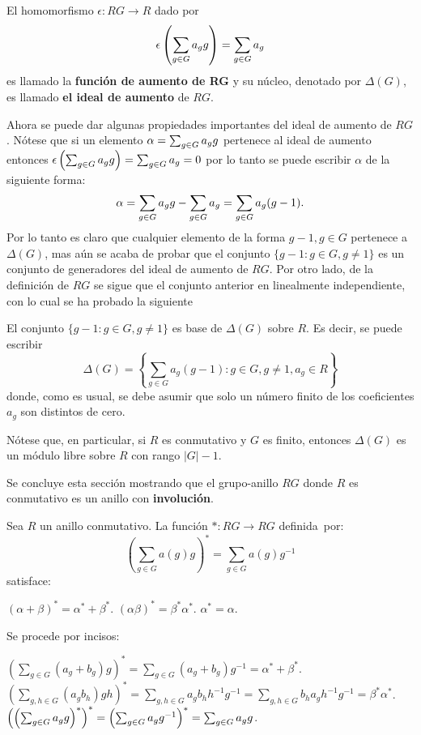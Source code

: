\begin{definicion}
El homomorfismo $\epsilon \colon RG \to R$ dado por \[ \epsilon \left( \sum_{g \in G} a_{g} g\right) = \sum_{g \in G}a_g \] es llamado la \textbf{ función de aumento de RG} y su núcleo, denotado por $\Delta (G)$, es llamado \textbf{el ideal de aumento} de $RG$.
\end{definicion}
Ahora se puede dar algunas propiedades importantes del ideal de aumento de $RG$. Nótese que si un elemento $\alpha = \sum_{g \in G} a_{g} g$ pertenece al ideal de aumento entonces $ \epsilon \left( \sum_{g \in G} a_{g} g\right) = \sum_{g \in G}a_g = 0 $ por lo tanto se puede escribir $\alpha$ de la siguiente forma: 
\[\alpha = \sum_{g \in G} a_{g} g -\sum_{g \in G}a_g = \sum_{g \in G}a_g(g-1). \]
Por lo tanto es claro que cualquier elemento de la forma $g-1, g \in G$ pertenece a $\Delta(G)$, mas aún se acaba de probar que el conjunto $\{g-1 : g \in G, g \neq 1\}$ es un conjunto de generadores del ideal de aumento de $RG$. Por otro lado, de la definición de $RG$ se sigue que el conjunto anterior en linealmente independiente, con lo cual se ha probado la siguiente
\begin{proposicion} \label{gen}
El conjunto $\{ g-1 : g \in G , g \neq 1\}$ es base de $\Delta (G)$ sobre $R$. Es decir, se puede escribir
\begin{equation*}
\Delta (G) = \left\{ \sum_{g \in G} a_g(g-1) : g \in G , g \neq 1, a_g \in R \right\}
\end{equation*}
donde, como es usual, se debe asumir que solo un número finito de los coeficientes $a_g$ son distintos de cero.
\end{proposicion}
Nótese que, en particular, si $R$ es conmutativo y $G$ es finito, entonces $\Delta (G)$ es un módulo libre sobre $R$ con rango $|G|-1$.

Se concluye esta sección mostrando que el grupo-anillo $RG$ donde $R$ es conmutativo es un anillo con \textbf{involución}.
\begin{proposicion}\label{prep:conjugacion}
Sea $R$ un anillo conmutativo. La función $* \colon RG \to RG$ definida~\nopagebreak[0] por: 
\begin{equation}
\left(\sum_{g \in G}a(g)g\right)^* = \sum_{g \in G} a(g) g^{-1}
\end{equation}
satisface: 
\begin{bulletList}
\newItem $(\alpha + \beta)^* = \alpha^* + \beta^*$.
\newItem $(\alpha\beta)^* = \beta^*\alpha^*$.
\newItem $\alpha^* = \alpha$.
\end{bulletList}
\end{proposicion}
\begin{proof*}
Se procede por incisos:
\begin{bulletList}
\newItem $\left( \sum_{g \in G} (a_g +b_g)g\right)^* =  \sum_{g \in G} (a_g +b_g)g^{-1} = \alpha^* + \beta^*$.
\newItem  $\left( \sum_{g, h \in G} (a_gb_h)gh\right)^* = \sum_{g,h \in G} a_gb_hh^{-1}g^{-1} = \sum_{g,h \in G} b_h a_g h^{-1}g^{-1} = \beta^*\alpha^*$.
\newItem  $\left(\left( \sum_{g \in G} a_{g} g\right)^*\right)^* = \left(\sum_{g\in G}a_gg^{-1}\right)^* = \sum_{g \in G} a_{g} g$.\qedhere
\end{bulletList}
\end{proof*}
